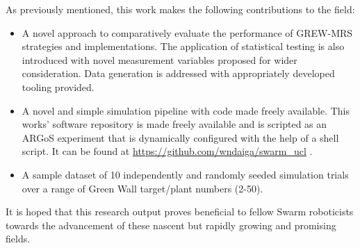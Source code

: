 \documentclass{report}
\begin{document}
As previously mentioned, this work makes the following contributions to the field:

\begin{itemize}
	\item A novel approach to comparatively evaluate the performance of GREW-MRS strategies and implementations. The application of statistical testing is also introduced with novel measurement variables proposed for wider consideration. Data generation is addressed with appropriately developed tooling provided.
	\item A novel and simple simulation pipeline with code made freely available. This works' software repository is made freely available and is scripted as an ARGoS experiment that is dynamically configured with the help of a shell script. It can be found at \url{https://github.com/wndaiga/swarm_ucl} \cite{SWARMCODE}.
	\item A sample dataset of 10 independently and randomly seeded simulation trials over a range of Green Wall target/plant numbers (2-50).
\end{itemize}

It is hoped that this research output proves beneficial to fellow Swarm roboticists towards the advancement of these nascent but rapidly growing and promising fields.




\newpage
\end{document}
